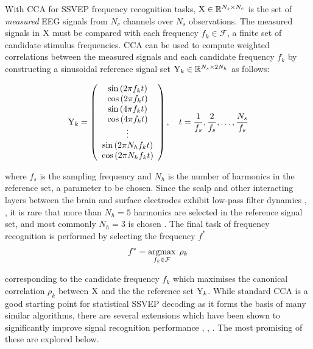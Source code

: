 With CCA for SSVEP frequency recognition tasks, ${\textrm{X}} \in \mathbb{R}^{N_s\times N_c}$ is the set of \textit{measured} EEG signals from $N_c$ channels over $N_s$ observations. The measured signals in ${\textrm{X}}$ must be compared with each frequency $f_k \in \mathcal{F}$, a finite set of candidate stimulus frequencies. CCA can be used to compute weighted correlations between the measured signals and each candidate frequency $f_k$ by constructing a sinusoidal reference signal set ${\textrm{Y}}_k \in \mathbb{R}^{N_s \times 2N_h}$ as follows: 

\begin{equation}
\mY_{k}=\left(\begin{array}{c}
\sin \left(2 \pi f_{k} t\right) \\
\cos \left(2 \pi f_{k} t\right) \\
\sin \left(4 \pi f_{k} t\right) \\
\cos \left(4 \pi f_{k} t\right) \\
\vdots \\
\sin \left(2 \pi N_h f_{k} t\right) \\
\cos \left(2 \pi N_h f_{k} t\right)
\end{array}\right), \quad t=\frac{1}{f_s}, \frac{2}{f_s}, \ldots, \frac{N_s}{f_s}
\label{eq:sinusoidal-ref}
\vspace{0.15cm}
\end{equation}

where $f_s$ is the sampling frequency and $N_h$ is the number of harmonics in the reference set, a parameter to be chosen. Since the scalp and other interacting layers between the brain and surface electrodes exhibit low-pass filter dynamics \cite{baillet-em-brain-mapping}, \cite{lin-cca-2006}, it is rare that more than $N_h=5$ harmonics are selected in the reference signal set, and most commonly $N_h=3$ is chosen \cite{lin-cca-2006}. The final task of frequency recognition is performed by selecting the frequency $f^*$
\begin{equation}
    f^* = \operatorname*{argmax}_{f_k \in \mathcal{F}} \; \rho_k
    \label{eq:cca-freq-discrimination}
\end{equation}

corresponding to the candidate frequency $f_k$ which maximises the canonical correlation $\rho_k$ between ${\textrm{X}}$ and the the reference set ${\textrm{Y}}_k$. While standard CCA is a good starting point for statistical SSVEP decoding as it forms the basis of many similar algorithms, there are several extensions which have been shown to significantly improve signal recognition performance \cite{zhang-mset-cca}, \cite{sun-gcca}, \cite{miao-hybrid-cca}. The most promising of these are explored below.

